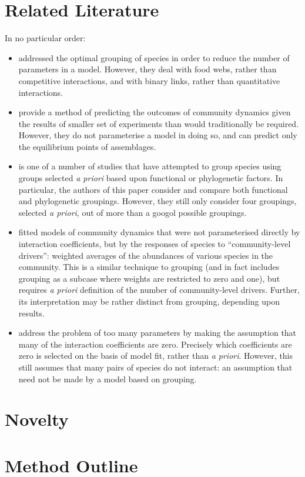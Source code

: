 \documentclass[a4paper,11pt]{article}
\begin{document}
\section{Related Literature}

In no particular order:
\begin{itemize}
	\item
		\Textcite{allesina2009food} addressed the optimal grouping of species in order to reduce the number of parameters in a model.
		However, they deal with food webs, rather than competitive interactions, and with binary links, rather than quantitative interactions.
	\item
		\Textcite{maynard2020predicting} provide a method of predicting the outcomes of community dynamics given the results of smaller set of experiments than would traditionally be required.
		However, they do not parameterise a model in doing so, and can predict only the equilibrium points of assemblages.
	\item
		\Textcite{uriarte2004spatially} is one of a number of studies that have attempted to group species using groups selected \emph{a priori} based upon functional or phylogenetic factors.
		In particular, the authors of this paper consider and compare both functional and phylogenetic groupings.
		However, they still only consider four groupings, selected \emph{a priori}, out of more than a googol possible groupings.
	\item
		\Textcite{ovaskainen2017species} fitted models of community dynamics that were not parameterised directly by interaction coefficients, but by the responses of species to ``community-level drivers'': weighted averages of the abundances of various species in the community.
		This is a similar technique to grouping (and in fact includes grouping as a subcase where weights are restricted to zero and one), but requires \emph{a priori} definition of the number of community-level drivers.
		Further, its interpretation may be rather distinct from grouping, depending upon results.
	\item
		\Textcite{weiss2021disentangling} address the problem of too many parameters by making the assumption that many of the interaction coefficients are zero.
		Precisely which coefficients are zero is selected on the basis of model fit, rather than \emph{a priori}.
		However, this still assumes that many pairs of species do not interact: an assumption that need not be made by a model based on grouping.
\end{itemize}

\section{Novelty}

\section{Method Outline}

\FloatBarrier
\printbibliography
\end{document}
